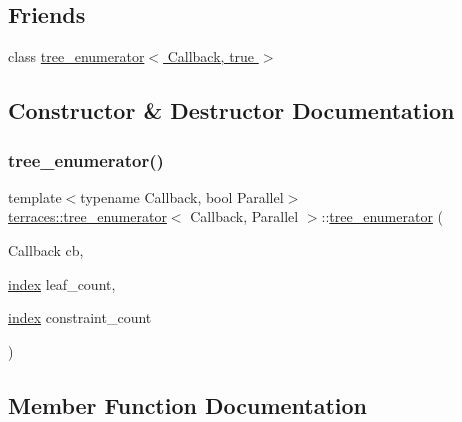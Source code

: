 \subsection*{Friends}
\begin{DoxyCompactItemize}
\item 
class \hyperlink{classterraces_1_1tree__enumerator_a9233453e725dd710bc8d92a5291f832b}{tree\+\_\+enumerator$<$ Callback, true $>$}
\end{DoxyCompactItemize}


\subsection{Constructor \& Destructor Documentation}
\mbox{\label{classterraces_1_1tree__enumerator_abac88ae38b6f65882007d15d4a4fc213}} 
\subsubsection{\texorpdfstring{tree\+\_\+enumerator()}{tree\_enumerator()}}
{\footnotesize\ttfamily template$<$typename Callback, bool Parallel$>$ \\
\hyperlink{classterraces_1_1tree__enumerator}{terraces\+::tree\+\_\+enumerator}$<$ Callback, Parallel $>$\+::\hyperlink{classterraces_1_1tree__enumerator}{tree\+\_\+enumerator} (\begin{DoxyParamCaption}\item[{Callback}]{cb,  }\item[{\hyperlink{namespaceterraces_adbc33ccb543d1634e96d0eb02e472c77}{index}}]{leaf\+\_\+count,  }\item[{\hyperlink{namespaceterraces_adbc33ccb543d1634e96d0eb02e472c77}{index}}]{constraint\+\_\+count }\end{DoxyParamCaption})}



\subsection{Member Function Documentation}
\mbox{\label{classterraces_1_1tree__enumerator_a050104cc4faec501e8329c427730e372}} 
